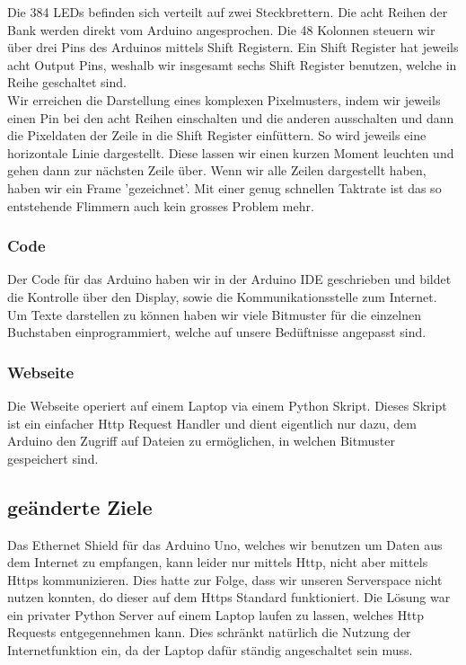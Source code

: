 \documentclass[10pt,a4paper]{article}
\begin{document}
Die 384 LEDs befinden sich verteilt auf zwei Steckbrettern. Die acht Reihen der Bank werden direkt vom Arduino angesprochen. Die 48 Kolonnen steuern wir über drei Pins des Arduinos mittels Shift Registern. Ein Shift Register hat jeweils acht Output Pins, weshalb wir insgesamt sechs Shift Register benutzen, welche in Reihe geschaltet sind.\\
Wir erreichen die Darstellung eines komplexen Pixelmusters, indem wir jeweils einen Pin bei den acht Reihen einschalten und die anderen ausschalten und dann die Pixeldaten der Zeile in die Shift Register einfüttern. So wird jeweils eine horizontale Linie dargestellt. Diese lassen wir einen kurzen Moment leuchten und gehen dann zur nächsten Zeile über. Wenn wir alle Zeilen dargestellt haben, haben wir ein Frame 'gezeichnet'. Mit einer genug schnellen Taktrate ist das so entstehende Flimmern auch kein grosses Problem mehr.\\

\subsubsection{Code}

Der Code für das Arduino haben wir in der Arduino IDE geschrieben und bildet die Kontrolle über den Display, sowie die Kommunikationsstelle zum Internet.\\
Um Texte darstellen zu können haben wir viele Bitmuster für die einzelnen Buchstaben einprogrammiert, welche auf unsere Bedüftnisse angepasst sind.\\

\subsubsection{Webseite}

Die Webseite operiert auf einem Laptop via einem Python Skript. Dieses Skript ist ein einfacher Http Request Handler und dient eigentlich nur dazu, dem Arduino den Zugriff auf Dateien zu ermöglichen, in welchen Bitmuster gespeichert sind.\\

\subsection{geänderte Ziele}

Das Ethernet Shield für das Arduino Uno, welches wir benutzen um Daten aus dem Internet zu empfangen, kann leider nur mittels Http, nicht aber mittels Https kommunizieren. Dies hatte zur Folge, dass wir unseren Serverspace nicht nutzen konnten, do dieser auf dem Https Standard funktioniert. Die Lösung war ein privater Python Server auf einem Laptop laufen zu lassen, welches Http Requests entgegennehmen kann. Dies schränkt natürlich die Nutzung der Internetfunktion ein, da der Laptop dafür ständig angeschaltet sein muss.\\
\end{document}
